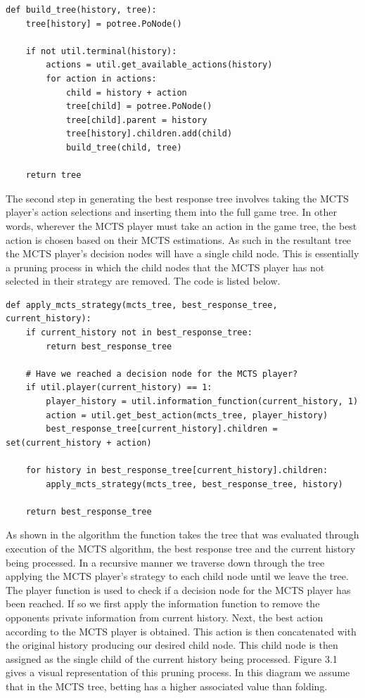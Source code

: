 \begin{lstlisting}[style=Python]
def build_tree(history, tree):
    tree[history] = potree.PoNode()

    if not util.terminal(history):
        actions = util.get_available_actions(history)
        for action in actions:
            child = history + action
            tree[child] = potree.PoNode()
            tree[child].parent = history
            tree[history].children.add(child)
            build_tree(child, tree)

    return tree
\end{lstlisting}

The second step in generating the best response tree involves taking the MCTS player's action
selections and inserting them into the full game tree\citep{heinrich2017reinforcement}.
In other words, wherever the MCTS player must take an action in the game tree, the best action is chosen
based on their MCTS estimations.
As such in the resultant tree the MCTS player's decision nodes will have
a single child node.
This is essentially a pruning process in which the child nodes that the MCTS player has
not selected in their strategy are removed.
The code is listed below.

\begin{lstlisting}[style=Python]
def apply_mcts_strategy(mcts_tree, best_response_tree, current_history):
    if current_history not in best_response_tree:
        return best_response_tree

    # Have we reached a decision node for the MCTS player?
    if util.player(current_history) == 1:
        player_history = util.information_function(current_history, 1)
        action = util.get_best_action(mcts_tree, player_history)
        best_response_tree[current_history].children = set(current_history + action)

    for history in best_response_tree[current_history].children:
        apply_mcts_strategy(mcts_tree, best_response_tree, history)

    return best_response_tree
\end{lstlisting}

As shown in the algorithm the function takes the tree that was evaluated
through execution of the MCTS algorithm, the best response tree and the current history being processed.
In a recursive manner we traverse down through the tree applying the MCTS player's
strategy to each child node until we leave the tree.
The player function is used to check if a decision node for the MCTS player has been reached.
If so we first apply the information function to remove the opponents private information from current history.
Next, the best action according to the MCTS player is obtained.
This action is then concatenated with the original history producing our desired child node.
This child node is then assigned as the single child of the current history being processed.
Figure 3.1 gives a visual representation of this pruning process.
In this diagram we assume that in the MCTS tree, betting has a higher associated value than folding.

